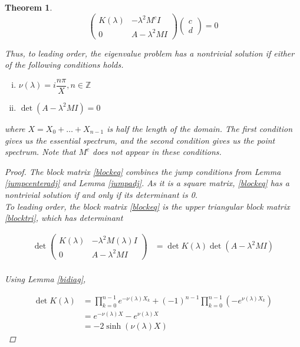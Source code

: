 \documentclass[12pt]{article}
\def\Z{{\mathbb Z}}
\newtheorem{theorem}{Theorem}
\begin{document}
\begin{theorem}
\begin{equation}\label{blocktri}
\begin{pmatrix}
K(\lambda) & -\lambda^2 M^c I  \\
0 & A - \lambda^2 MI 
\end{pmatrix}
\begin{pmatrix}c \\ d \end{pmatrix} = 0
\end{equation}

Thus, to leading order, the eigenvalue problem has a nontrivial solution if either of the following conditions holds.

\begin{enumerate}[(i)]
\item $\nu(\lambda) = i \dfrac{n \pi}{X}, n \in \Z$ 
\item $\det(A - \lambda^2 MI) = 0$
\end{enumerate}

where $X = X_0 + \dots + X_{n-1}$ is half the length of the domain. The first condition gives us the essential spectrum, and the second condition gives us the point spectrum. Note that $M^c$ does not appear in these conditions.\\

\begin{proof}
The block matrix \eqref{blockeq} combines the jump conditions from Lemma \ref{jumpcenteradj} and Lemma \ref{jumpadj}. As it is a square matrix, \eqref{blockeq} has a nontrivial solution if and only if its determinant is 0.\\

To leading order, the block matrix \eqref{blockeq} is the upper triangular block matrix \eqref{blocktri}, which has determinant 

\begin{align*}
\det \begin{pmatrix}
K(\lambda) & -\lambda^2 M(\lambda) I \\
0 & A - \lambda^2 MI
\end{pmatrix} &= \det K(\lambda) \det(A - \lambda^2 MI)\\
\end{align*}

Using Lemma \ref{bidiag}, 

\begin{align*}
\det K(\lambda) &= \prod_{k = 0}^{n-1} e^{-\nu(\lambda)X_k} + (-1)^{n-1} \prod_{k = 0}^{n-1} (-e^{\nu(\lambda)X_k}) \\
&= e^{-\nu(\lambda) X} - e^{\nu(\lambda) X} \\
&= -2 \sinh( \nu(\lambda) X )
\end{align*}


\end{proof}
\end{theorem}
\end{document}

